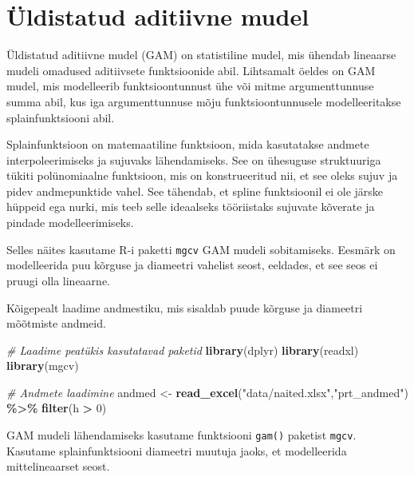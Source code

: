 \documentclass[
]{book}
\newenvironment{Shaded}{\begin{snugshade}}{\end{snugshade}}
\newcommand{\CommentTok}[1]{\textcolor[rgb]{0.56,0.35,0.01}{\textit{#1}}}
\newcommand{\DecValTok}[1]{\textcolor[rgb]{0.00,0.00,0.81}{#1}}
\newcommand{\FunctionTok}[1]{\textcolor[rgb]{0.13,0.29,0.53}{\textbf{#1}}}
\newcommand{\NormalTok}[1]{#1}
\newcommand{\OtherTok}[1]{\textcolor[rgb]{0.56,0.35,0.01}{#1}}
\newcommand{\SpecialCharTok}[1]{\textcolor[rgb]{0.81,0.36,0.00}{\textbf{#1}}}
\newcommand{\StringTok}[1]{\textcolor[rgb]{0.31,0.60,0.02}{#1}}
\renewenvironment{Shaded} {\begin{snugshade}\footnotesize} {\end{snugshade}}
\begin{document}
\section{Üldistatud aditiivne mudel}\label{uxfcldistatud-aditiivne-mudel}

Üldistatud aditiivne mudel (GAM) on statistiline mudel, mis ühendab lineaarse mudeli omadused aditiivsete funktsioonide abil. Lihtsamalt öeldes on GAM mudel, mis modelleerib funktsioontunnust ühe või mitme argumenttunnuse summa abil, kus iga argumenttunnuse mõju funktsioontunnusele modelleeritakse splainfunktsiooni abil.

Splainfunktsioon on matemaatiline funktsioon, mida kasutatakse andmete interpoleerimiseks ja sujuvaks lähendamiseks. See on ühesuguse struktuuriga tükiti polünomiaalne funktsioon, mis on konstrueeritud nii, et see oleks sujuv ja pidev andmepunktide vahel. See tähendab, et spline funktsioonil ei ole järske hüppeid ega nurki, mis teeb selle ideaalseks tööriistaks sujuvate kõverate ja pindade modelleerimiseks.

Selles näites kasutame R-i paketti \texttt{mgcv} GAM mudeli sobitamiseks. Eesmärk on modelleerida puu kõrguse ja diameetri vahelist seost, eeldades, et see seos ei pruugi olla lineaarne.

Kõigepealt laadime andmestiku, mis sisaldab puude kõrguse ja diameetri mõõtmiste andmeid.

\begin{Shaded}
\begin{Highlighting}[]
\CommentTok{\# Laadime peatükis kasutatavad paketid}
\FunctionTok{library}\NormalTok{(dplyr)}
\FunctionTok{library}\NormalTok{(readxl)}
\FunctionTok{library}\NormalTok{(mgcv)}
\end{Highlighting}
\end{Shaded}

\begin{Shaded}
\begin{Highlighting}[]
\CommentTok{\# Andmete laadimine}
\NormalTok{andmed }\OtherTok{\textless{}{-}} \FunctionTok{read\_excel}\NormalTok{(}\StringTok{"data/naited.xlsx"}\NormalTok{,}\StringTok{"prt\_andmed"}\NormalTok{) }\SpecialCharTok{\%\textgreater{}\%} \FunctionTok{filter}\NormalTok{(h }\SpecialCharTok{\textgreater{}} \DecValTok{0}\NormalTok{)}
\end{Highlighting}
\end{Shaded}

GAM mudeli lähendamiseks kasutame funktsiooni \texttt{gam()} paketist \texttt{mgcv}. Kasutame splainfunktsiooni diameetri muutuja jaoks, et modelleerida mittelineaarset seost.
\end{document}
